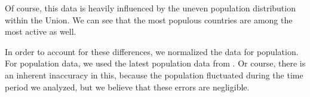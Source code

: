 \documentclass[lettersize,journal]{IEEEtran}
\begin{document}
Of course, this data is heavily influenced by the uneven population distribution within the Union. We can see that the most populous countries are among the most active as well.

In order to account for these differences, we normalized the data for population. For population data, we used the latest population data from \cite{citypopulation}. Or course, there is an inherent inaccuracy in this, because the population fluctuated during the time period we analyzed, but we believe that these errors are negligible.

\end{document}
